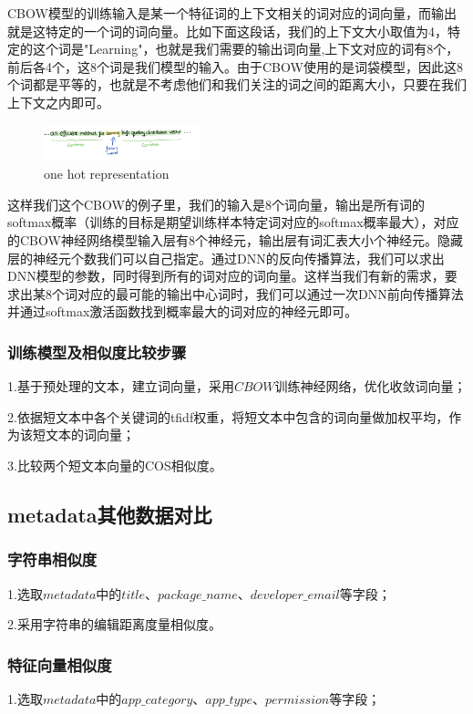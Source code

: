 \documentclass[UTF8,a4paper,10pt, twocolumn]{ctexart}
\begin{document}
CBOW模型的训练输入是某一个特征词的上下文相关的词对应的词向量，而输出就是这特定的一个词的词向量。比如下面这段话，我们的上下文大小取值为4，特定的这个词是"Learning"，也就是我们需要的输出词向量,上下文对应的词有8个，前后各4个，这8个词是我们模型的输入。由于CBOW使用的是词袋模型，因此这8个词都是平等的，也就是不考虑他们和我们关注的词之间的距离大小，只要在我们上下文之内即可。

\begin{figure}[htbp]
  \centering
  \includegraphics[width=0.4\textwidth]{img/fig10.png}
  \caption{one hot representation}
  \label{figure:zju8}
  \end{figure}

这样我们这个CBOW的例子里，我们的输入是8个词向量，输出是所有词的softmax概率（训练的目标是期望训练样本特定词对应的softmax概率最大），对应的CBOW神经网络模型输入层有8个神经元，输出层有词汇表大小个神经元。隐藏层的神经元个数我们可以自己指定。通过DNN的反向传播算法，我们可以求出DNN模型的参数，同时得到所有的词对应的词向量。这样当我们有新的需求，要求出某8个词对应的最可能的输出中心词时，我们可以通过一次DNN前向传播算法并通过softmax激活函数找到概率最大的词对应的神经元即可。


\subsubsection{训练模型及相似度比较步骤}
1.基于预处理的文本，建立词向量，采用$CBOW$训练神经网络，优化收敛词向量；

2.依据短文本中各个关键词的tfidf权重，将短文本中包含的词向量做加权平均，作为该短文本的词向量；

3.比较两个短文本向量的COS相似度。

\subsection{metadata其他数据对比}
\subsubsection{字符串相似度}
1.选取$metadata$中的$title$、$package\_name$、$developer\_email$等字段；

2.采用字符串的编辑距离度量相似度。

\subsubsection{特征向量相似度}
1.选取$metadata$中的$app\_category$、$app\_type$、$permission$等字段；
\end{document}
